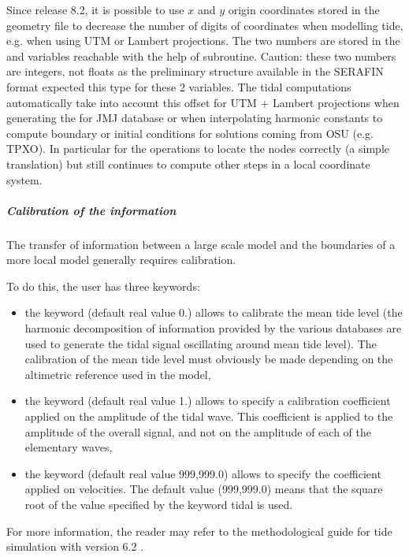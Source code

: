 Since release 8.2, it is possible to use $x$ and $y$ origin coordinates stored
in the geometry file to decrease the number of digits of coordinates
when modelling tide, e.g. when using UTM or Lambert projections.
The two numbers are stored in the  and 
variables reachable with the help of  subroutine.
Caution: these two numbers are integers, not floats as the preliminary structure
available in the SERAFIN format expected this type for these 2 variables.
The tidal computations automatically take into account this offset for
UTM + Lambert projections when generating the 
for JMJ database or when interpolating harmonic constants to compute boundary
or initial conditions for solutions coming from OSU (e.g. TPXO).
In particular for the operations to locate the nodes correctly (a simple
translation) but  still continues to compute other steps in a local
coordinate system.

\subparagraph{Calibration of the information}

The transfer of information between a large scale model and the boundaries of
a more local model generally requires calibration.

To do this, the user has three keywords:

\begin{itemize}
\item the keyword  (default real
value 0.) allows to calibrate the mean tide level (the harmonic decomposition
of information provided by the various databases are used to generate the tidal
signal oscillating around mean tide level).
The calibration of the mean tide level must obviously be made depending on the
altimetric reference used in the model,

\item the keyword  (default real
value 1.) allows to specify a calibration coefficient applied on the amplitude
of the tidal wave.
This coefficient is applied to the amplitude of the overall signal, and not on
the amplitude of each of the elementary waves,

\item the keyword 
(default real value 999,999.0) allows to specify the coefficient applied on
velocities.
The default value (999,999.0) means that the square root of the value specified
by the keyword  tidal is used.
\end{itemize}

For more information, the reader may refer to the methodological guide
for tide simulation with version 6.2 \cite{Pham2012}.
